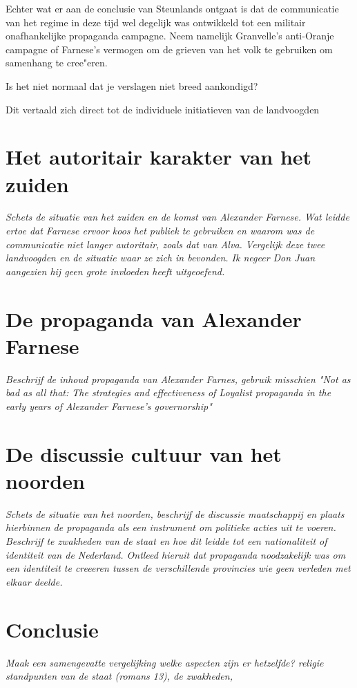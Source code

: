 \documentclass[11pt]{amsart}
\begin{document}
Echter wat er aan de conclusie van Steunlands ontgaat is dat de communicatie van het regime in deze tijd wel degelijk
was ontwikkeld tot een militair onafhankelijke propaganda campagne. Neem namelijk Granvelle's anti-Oranje campagne of
Farnese's vermogen om de grieven van het volk te gebruiken om samenhang te cree"eren.

Is het niet normaal dat je verslagen niet breed aankondigd?

Dit vertaald zich direct tot de individuele initiatieven van de landvoogden

\newpage

\section{Het autoritair karakter van het zuiden}
\textit{Schets de situatie van het zuiden en de komst van Alexander Farnese. Wat leidde ertoe dat Farnese ervoor koos het
     publiek te gebruiken en waarom was de communicatie niet langer autoritair, zoals dat van Alva. Vergelijk deze twee
     landvoogden en de situatie waar ze zich in bevonden. Ik negeer Don Juan aangezien hij geen grote invloeden heeft
     uitgeoefend.}

\section{De propaganda van Alexander Farnese}
\textit{Beschrijf de inhoud propaganda van Alexander Farnes, gebruik misschien "Not as bad as all that: The strategies and effectiveness of Loyalist propaganda in the early years of Alexander Farnese's governorship"}

\section{De discussie cultuur van het noorden}
\textit{Schets de situatie van het noorden, beschrijf de discussie maatschappij en plaats hierbinnen de propaganda als een
     instrument om politieke acties uit te voeren. Beschrijf te zwakheden van de staat en hoe dit leidde tot een nationaliteit of identiteit van de Nederland. Ontleed hieruit dat propaganda noodzakelijk was om een identiteit te creeeren tussen de verschillende provincies wie geen verleden met elkaar deelde. }

\section{Conclusie}
\textit{Maak een samengevatte vergelijking welke aspecten zijn er hetzelfde? religie standpunten van de staat (romans 13), de zwakheden, }

\newpage\printbibliography{}
\end{document}
